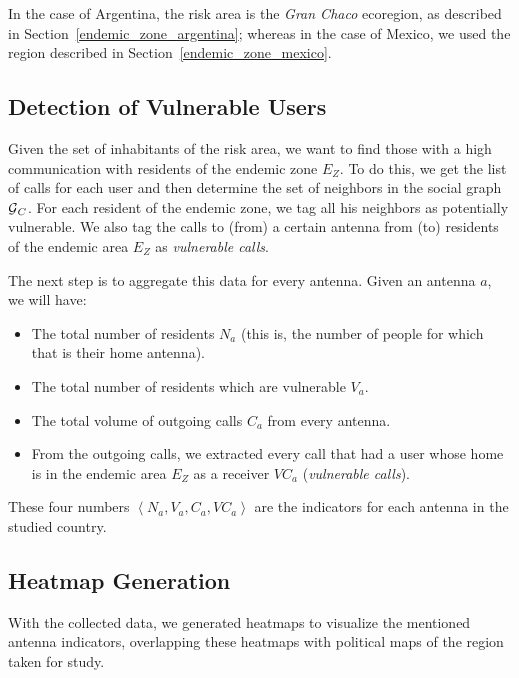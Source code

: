In the case of Argentina, the risk area is the \textit{Gran Chaco} ecoregion, as described in Section~\ref{endemic_zone_argentina};
whereas in the case of Mexico, we used the region described in Section~\ref{endemic_zone_mexico}.


\subsection{Detection of Vulnerable Users}

    Given the set of inhabitants of the risk area, we want to find those with a high communication with residents of the endemic zone $E_Z$. To do this, we get the list of calls for each user and then determine the set of neighbors in the social graph $\operatorname{\mathcal{G}}_C$. For each resident of the endemic zone, we tag all his neighbors as potentially vulnerable. We also tag the calls to (from) a certain antenna from (to) residents of the endemic area $E_Z$ as \textit{vulnerable calls}.
    
    The next step is to aggregate this data for every antenna. Given an antenna $a$, we will have:
    \begin{itemize}
        \item The total number of residents $N_a$ (this is, the number of people for which that is their home antenna).
        \item The total number of residents which are vulnerable $V_a$.
		\item The total volume of outgoing calls $C_a$ from every antenna.
		\item From the outgoing calls, we extracted every call that had a user whose home is in the endemic area $E_Z$ as a receiver $VC_a$ (\textit{vulnerable calls}).
    \end{itemize}
    
    These four numbers $\left< N_a, V_a, C_a, VC_a \right>$ are the indicators for each antenna in the studied country.



\subsection{Heatmap Generation}
    With the collected data, we generated heatmaps to visualize the mentioned antenna indicators, overlapping these heatmaps with political maps of the region taken for study.
    

